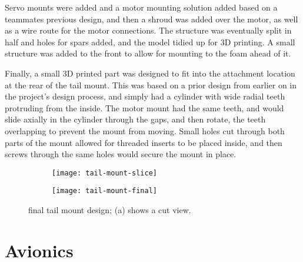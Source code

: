 \documentclass[../../main.tex]{subfiles}
\begin{document}
Servo mounts were added and a motor mounting solution added based on a teammates previous design, and then a shroud was added over the motor, as well as a wire route for the motor connections.
The structure was eventually split in half and holes for spars added, and the model tidied up for 3D printing. 
A small structure was added to the front to allow for mounting to the foam ahead of it.

Finally, a small 3D printed part was designed to fit into the attachment location at the rear of the tail mount.
This was based on a prior design from earlier on in the project's design process, and simply had a cylinder with wide radial teeth protruding from the inside.
The motor mount had the same teeth, and would slide axially in the cylinder through the gaps, and then rotate, the teeth overlapping to prevent the mount from moving.
Small holes cut through both parts of the mount allowed for threaded inserts to be placed inside, and then screws through the same holes would secure the mount in place. 


\begin{figure}[H]
    \centering
    \begin{subfigure}[b]{0.49\columnwidth}
        \centering
        \texttt{[image: tail-mount-slice]}
        \caption{}
        \label{fig:tail-mount-design:slice}
    \end{subfigure}
    \hfill
    \begin{subfigure}[b]{0.49\columnwidth}
        \centering
        \texttt{[image: tail-mount-final]}
        \caption{}
        \label{fig:tail-mount-design:whole}
    \end{subfigure}
    
    \caption{final tail mount design; (a) shows a cut view.}
    \label{fig:tail-mount-design}
\end{figure} 



\section{Avionics} \label{sec:final-design-proposal:avionics}
\end{document}
